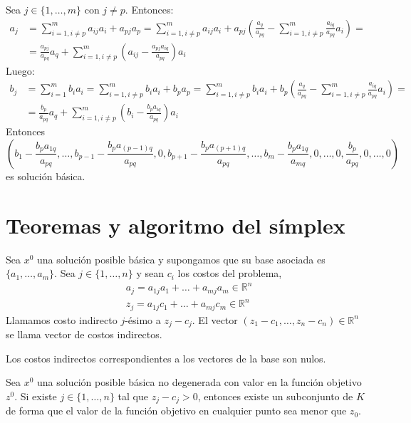Sea $j \in \{1, \dots, m\}$ con $j \neq p$.
Entonces:
\begin{align*}
    a_j & = \sum_{i=1, i \neq p}^m a_{ij}a_i + a_{pj}a_p = \sum_{i=1, i \neq p}^m a_{ij}a_i + a_{pj} \left(\frac{a_q}{a_{pq}} - \sum_{i=1, i \neq p}^m \frac{a_{iq}}{a_{pq}}a_i\right) = \\
        & = \frac{a_{pj}}{a_{pq}}a_q + \sum_{i=1, i \neq p}^m \left(a_{ij} - \frac{a_{pj}a_{iq}}{a_{pq}}\right)a_i
\end{align*}
Luego:
\begin{align*}
    b_j & = \sum_{i=1}^m b_ia_i = \sum_{i=1, i \neq p}^m b_ia_i + b_pa_p = \sum_{i=1, i \neq p}^m b_ia_i + b_p\left(\frac{a_q}{a_{pq}} - \sum_{i=1, i \neq p}^m \frac{a_{iq}}{a_{pq}}a_i\right) = \\
        & = \frac{b_p}{a_{pq}}a_q + \sum_{i=1, i \neq p}^m \left(b_i - \frac{b_pa_{iq}}{a_{pq}}\right)a_i
\end{align*}
Entonces
$$\left( b_1 - \frac{b_pa_{1q}}{a_{pq}}, \dots, b_{p-1} - \frac{b_pa_{(p-1)q}}{a_{pq}}, 0, b_{p+1} - \frac{b_pa_{(p+1)q}}{a_{pq}}, \dots, b_m - \frac{b_pa_{1q}}{a_{mq}}, 0, \dots, 0, \frac{b_p}{a_{pq}}, 0, \dots, 0 \right)$$
es solución básica.

\section{Teoremas y algoritmo del símplex}
\begin{definition}
    Sea $x^0$ una solución posible básica y supongamos que su base asociada es $\{a_1, \dots, a_m\}$.
    Sea $j \in \{1, \dots, n\}$ y sean $c_i$ los costos del problema,
    \begin{align*}
         & a_j = a_{1j}a_1 + \dots + a_{mj}a_m \in \mathbb{R}^n \\
         & z_j = a_{1j}c_1 + \dots + a_{mj}c_m \in \mathbb{R}^n
    \end{align*}
    Llamamos costo indirecto $j$-ésimo a $z_j - c_j$.
    El vector $(z_1-c_1, \dots, z_n-c_n) \in \mathbb{R}^n$ se llama vector de costos indirectos.
\end{definition}

\begin{remark}
    Los costos indirectos correspondientes a los vectores de la base son nulos.
\end{remark}

\begin{theorem}
    Sea $x^0$ una solución posible básica no degenerada con valor en la función objetivo $z^0$.
    Si existe $j \in \{1, \dots, n\}$ tal que $z_j - c_j > 0$, entonces existe un subconjunto de $K$ de forma que el valor de la función objetivo en cualquier punto sea menor que $z_0$.
\end{theorem}

